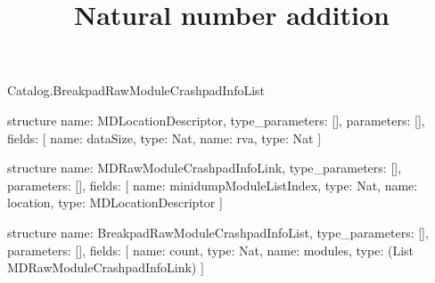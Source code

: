\begin{lexlean}{Catalog.BreakpadRawModuleCrashpadInfoList}
\title{Natural number addition}
\begin{semanticmodule}
structure{
  name: MDLocationDescriptor,
  type_parameters: [],
  parameters: [],
  fields: [
    {name: dataSize, type: Nat},
    {name: rva, type: Nat}
  ]
}

structure{
  name: MDRawModuleCrashpadInfoLink,
  type_parameters: [],
  parameters: [],
  fields: [
    {name: minidumpModuleListIndex, type: Nat},
    {name: location, type: MDLocationDescriptor}
  ]
}

structure{
  name: BreakpadRawModuleCrashpadInfoList,
  type_parameters: [],
  parameters: [],
  fields: [
    {name: count, type: Nat},
    {name: modules, type: (List MDRawModuleCrashpadInfoLink)}
  ]
}
\end{semanticmodule}
\end{lexlean}
